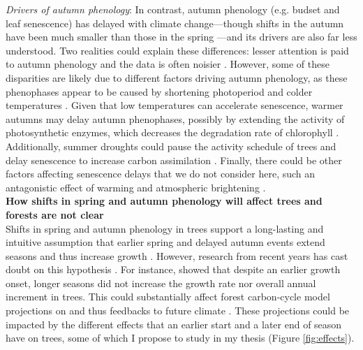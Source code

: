 \documentclass{article}
\begin{document}
\textit{Drivers of autumn phenology}: In contrast, autumn phenology (e.g. budset and leaf senescence) has delayed with climate change---though shifts in the autumn have been much smaller than those in the spring \citep{gallinat_autumn_2015,jeong_macroscale_2014}---and its drivers are also far less understood. Two realities could explain these differences: lesser attention is paid to autumn phenology \citep{piao_plant_2019} and the data is often noisier \citep{wu_canopy_2024}. However, some of these disparities are likely due to different factors driving autumn phenology, as these phenophases appear to be caused by shortening photoperiod and colder temperatures \citep{cooke_dynamic_2012,flynn_temperature_2018,korner_phenology_2010,delpierre_temperate_2016}. Given that low temperatures can accelerate senescence, warmer autumns may delay autumn phenophases, possibly by extending the activity of photosynthetic enzymes, which decreases the degradation rate of chlorophyll \citep{yan_divergent_2021}. Additionally, summer droughts could pause the activity schedule of trees and delay senescence to increase carbon assimilation \citep{dox_severe_2022}. Finally, there could be other factors affecting senescence delays that we do not consider here, such an antagonistic effect of warming and atmospheric brightening \citep{sanchezlorenzo_reassessment_2015,wu_atmospheric_2021}. \\

\textbf{How shifts in spring and autumn phenology will affect trees and forests are not clear} \\ 
Shifts in spring and autumn phenology in trees support a long-lasting and intuitive assumption that earlier spring and delayed autumn events extend seasons and thus increase growth \citep{keenan_net_2014, stridbeck_partly_2022}. However, research from recent years has cast doubt on this hypothesis \citep{dow_warm_2022,green_limits_2022,silvestro_longer_2023}. For instance, \cite{dow_warm_2022} showed that despite an earlier growth onset, longer seasons did not increase the growth rate nor overall annual increment in trees. This could substantially affect forest carbon-cycle model projections on and thus feedbacks to future climate \citep{richardson_climate_2013,swidrak_comparing_2013}. These projections could be impacted by the different effects that an earlier start and a later end of season have on trees, some of which I propose to study in my thesis (Figure \ref{fig:effects}). \\
\end{document}
